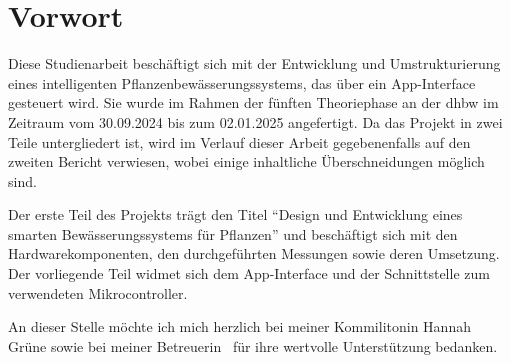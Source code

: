\chapter*{Vorwort}
Diese Studienarbeit beschäftigt sich mit der Entwicklung und Umstrukturierung eines intelligenten Pflanzenbewässerungssystems, das über ein App-Interface gesteuert wird. Sie wurde im Rahmen der fünften Theoriephase an der \ac{dhbw} im Zeitraum vom 30.09.2024 bis zum 02.01.2025 angefertigt. Da das Projekt in zwei Teile untergliedert ist, wird im Verlauf dieser Arbeit gegebenenfalls auf den zweiten Bericht verwiesen, wobei einige inhaltliche Überschneidungen möglich sind.

Der erste Teil des Projekts trägt den Titel ``Design und Entwicklung eines smarten Bewässerungssystems für Pflanzen'' und beschäftigt sich mit den Hardwarekomponenten, den durchgeführten Messungen sowie deren Umsetzung. Der vorliegende Teil widmet sich dem App-Interface und der Schnittstelle zum verwendeten Mikrocontroller.

An dieser Stelle möchte ich mich herzlich bei meiner Kommilitonin Hannah Grüne sowie bei meiner Betreuerin \BetreuerDHBW\ für ihre wertvolle Unterstützung bedanken.
